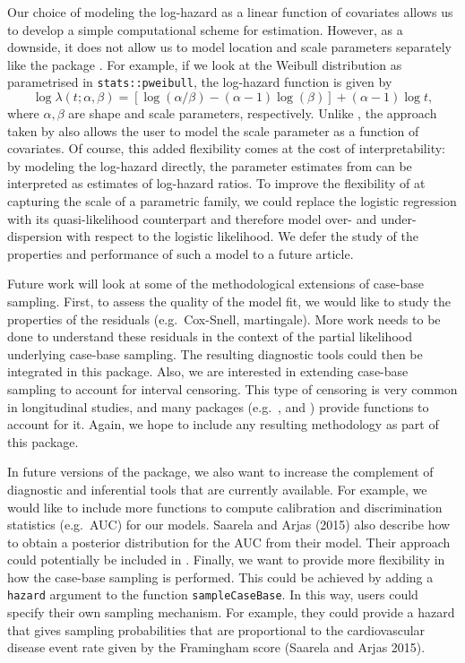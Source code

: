 Our choice of modeling the log-hazard as a linear function of covariates allows us to develop a simple computational scheme for estimation. However, as a downside, it does not allow us to model location and scale parameters separately like the package . For example, if we look at the Weibull distribution as parametrised in \texttt{stats::pweibull}, the log-hazard function is given by
\[ \log \lambda(t; \alpha, \beta) = \left[\log(\alpha/\beta) - (\alpha - 1)\log(\beta)\right] + (\alpha - 1)\log t,\]
where \(\alpha,\beta\) are shape and scale parameters, respectively. Unlike , the approach taken by  also allows the user to model the scale parameter as a function of covariates. Of course, this added flexibility comes at the cost of interpretability: by modeling the log-hazard directly, the parameter estimates from  can be interpreted as estimates of log-hazard ratios. To improve the flexibility of  at capturing the scale of a parametric family, we could replace the logistic regression with its quasi-likelihood counterpart and therefore model over- and under-dispersion with respect to the logistic likelihood. We defer the study of the properties and performance of such a model to a future article.

Future work will look at some of the methodological extensions of case-base sampling. First, to assess the quality of the model fit, we would like to study the properties of the residuals (e.g.~Cox-Snell, martingale). More work needs to be done to understand these residuals in the context of the partial likelihood underlying case-base sampling. The resulting diagnostic tools could then be integrated in this package. Also, we are interested in extending case-base sampling to account for interval censoring. This type of censoring is very common in longitudinal studies, and many packages (e.g.~,  and ) provide functions to account for it. Again, we hope to include any resulting methodology as part of this package.

In future versions of the package, we also want to increase the complement of diagnostic and inferential tools that are currently available. For example, we would like to include more functions to compute calibration and discrimination statistics (e.g.~AUC) for our models. Saarela and Arjas (2015) also describe how to obtain a posterior distribution for the AUC from their model. Their approach could potentially be included in . Finally, we want to provide more flexibility in how the case-base sampling is performed. This could be achieved by adding a \texttt{hazard} argument to the function \texttt{sampleCaseBase}. In this way, users could specify their own sampling mechanism. For example, they could provide a hazard that gives sampling probabilities that are proportional to the cardiovascular disease event rate given by the Framingham score (Saarela and Arjas 2015).

